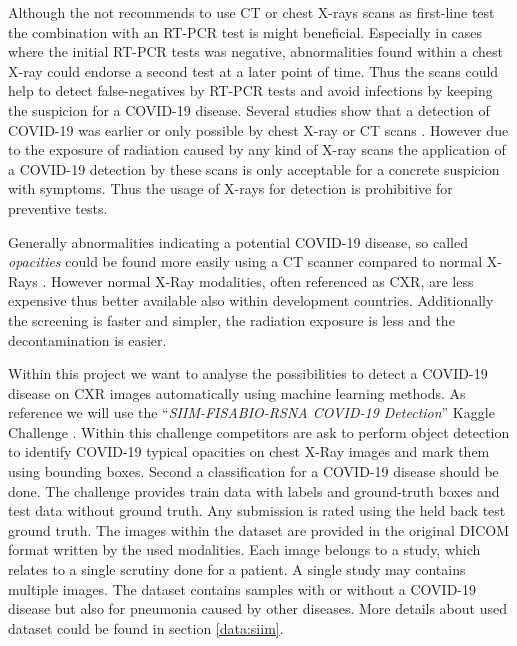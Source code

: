 Although the \citeauthor{acr2020recommendation} not recommends to use \ac{CT} or chest X-rays scans as first-line test \autocite{acr2020recommendation} the combination with an \ac{RT-PCR} test is might beneficial. Especially in cases where the initial \ac{RT-PCR} tests was negative, abnormalities found within a chest X-ray could endorse a second test at a later point of time. Thus the scans could help to detect false-negatives by \ac{RT-PCR} tests and avoid infections by keeping the suspicion for a COVID-19 disease. Several studies show that a detection of COVID-19 was earlier or only possible by chest X-ray or \ac{CT} scans \autocite{wang2020combination, tahamtan2020real}. However due to the exposure of radiation caused by any kind of X-ray scans the application of a COVID-19 detection by these scans is only acceptable for a concrete suspicion with symptoms. Thus the usage of X-rays for detection is prohibitive for preventive tests.

Generally abnormalities indicating a potential COVID-19 disease, so called \textit{opacities} could be found more easily using a CT scanner compared to normal X-Rays \autocite{jacobi2020portable}. However normal X-Ray modalities, often referenced as \acs{CXR}, are less expensive thus better available also within development countries. Additionally the screening is faster and simpler, the radiation exposure is less and the decontamination is easier.

Within this project we want to analyse the possibilities to detect a COVID-19 disease on \ac{CXR} images automatically using machine learning methods. As reference we will use the \enquote{\textit{SIIM-FISABIO-RSNA COVID-19 Detection}} Kaggle Challenge \autocite{SIIMKaggle}. Within this challenge competitors are ask to perform object detection to identify COVID-19 typical opacities on chest X-Ray images and mark them using bounding boxes. Second a classification for a COVID-19 disease should be done.
The challenge provides train data with labels and ground-truth boxes and test data without ground truth. Any submission is rated using the held back test ground truth. The images within the dataset are provided in the original DICOM format written by the used modalities. Each image belongs to a study, which relates to a single scrutiny done for a patient. A single study may contains multiple images. The dataset contains samples with or without a COVID-19 disease but also for pneumonia caused by other diseases. More details about used dataset could be found in section \ref{data:siim}.

